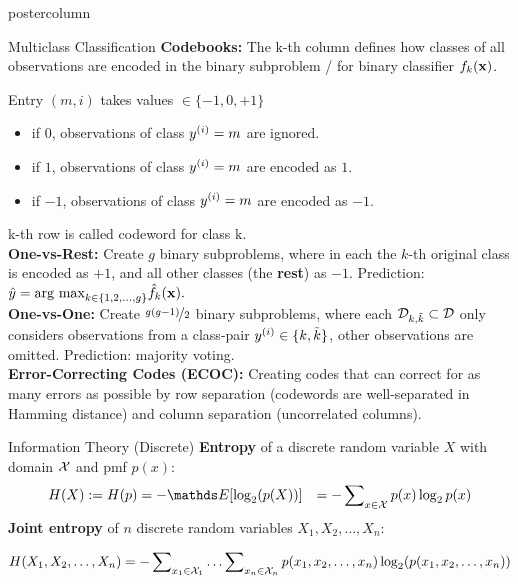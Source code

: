 \documentclass{beamer}
\begin{document}
\begin{frame}[fragile]{}
\begin{columns}
\begin{column}{.31\textwidth}
\begin{beamercolorbox}[center]{postercolumn}
\begin{minipage}{.98\textwidth}
{\begin{myblock}{Multiclass Classification}
%
 \textbf{Codebooks:}
 The k-th column defines how classes of all observations are encoded in the binary subproblem / for binary classifier $f_k(\mathbf{x})$.
 \item Entry $(m, i)$ takes values $\in \{-1, 0, +1\}$
 \begin{itemize}
 	\setlength{\itemindent}{+.3in}
 	\item if $0$, observations of class $y^{(i)} = m$ are ignored.
 	\item if $1$, observations of class $y^{(i)} = m$ are encoded as $1$.
 	\item if $- 1$, observations of class $y^{(i)} = m$ are encoded as $- 1$.
 \end{itemize} 
k-th row is called codeword for class k. \\
\textbf{One-vs-Rest:}
Create $g$ binary subproblems, where in each the $k$-th original class is encoded as $+1$, and all other classes (the \textbf{rest}) as $- 1$. Prediction:
%
$
\hat y = \text{arg max}_{k \in \{1, 2, ..., g\}} \hat f_k(\mathbf{x}). 
$\\
%
\textbf{One-vs-One:}  Create $\nicefrac{g(g - 1)}{2}$ binary subproblems, where each $\mathcal{D}_{k, \tilde k} \subset \mathcal{D}$ only considers observations from a class-pair $y^{(i)} \in \{k, \tilde k\}$, other observations are omitted.  Prediction: majority voting. \\
%
\textbf{Error-Correcting Codes (ECOC):} Creating codes that can correct for as many errors as possible by row separation (codewords are well-separated in Hamming distance) and column separation (uncorrelated columns).


\end{myblock}

\begin{myblock}{Information Theory (Discrete)}
%	
\textbf{Entropy} of a discrete random variable $X$ with domain $\mathcal{X}$ and pmf $p(x)$:
\begin{equation*}
	\begin{aligned} 
		H(X) := H(p) &= - \E[\log_2(p(X))]           &= -\sum\nolimits_{x \in \Xspace} p(x) \log_2 p(x) 
	\end{aligned} 
\end{equation*}
%
\textbf{Joint entropy} of $n$ discrete random variables $X_1, X_2, \ldots, X_n:$   
%
\begin{small}  
	$$ H(X_1, X_2, \ldots, X_n) = - \sum\nolimits_{x_1 \in \mathcal{X}_1} \ldots \sum\nolimits_{x_n \in \mathcal{X}_n} p(x_1,x_2, \ldots, x_n) \log_2(p(x_1,x_2, \ldots, x_n)) $$ 
\end{small}  


\end{myblock}}
\end{minipage}
\end{beamercolorbox}
\end{column}
\end{columns}
\end{frame}
\end{document}
